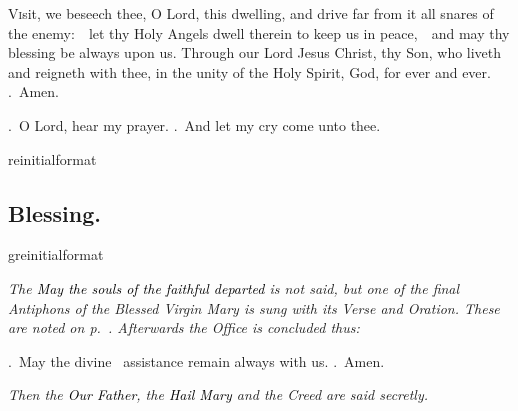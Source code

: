 \documentclass[12pt]{article} %
\newcommand{\myaboveinitial}[1]{%
    \expandafter\renewcommand\csname greinitialformat\endcsname[1]{%
        \fontsize{43}{43}\selectfont ##1
    }
    \gresetfirstlineaboveinitial{\textcolor{benred8}{\raisebox{6.0mm}{\small \textsc{\textbf{#1}}}}}{}
}
\newenvironment{rubric}{\vspace{1 mm}\color{benred8} \itshape \leftskip 0in \setlength{\parindent}{0.25in}}{\vspace{1 mm}}
\newenvironment{response}{\leftskip 0in \setlength{\parindent}{0in}}{\vspace{1 mm}}
\let\oldgresixstar\gresixstar
\renewcommand{\gresixstar}{\textcolor{benred8}{\oldgresixstar}}
\let\oldgredagger\gredagger
\renewcommand{\gredagger}{\textcolor{benred8}{\oldgredagger}}
\let\oldVbar\Vbar
\renewcommand{\Vbar}{\textcolor{benred8}{\oldVbar .}}
\let\oldRbar\Rbar
\renewcommand{\Rbar}{\textcolor{benred8}{\oldRbar .}}
\let\oldgrealtcross\grealtcross
\renewcommand{\grealtcross}{\textcolor{benred8}{\oldgrealtcross}}
\begin{document}
\begin{pages}
\begin{Rightside}
\begin{response}\lettrine{V}{i}sit, we beseech thee, O Lord, this dwelling, and drive far from it all snares of the enemy:~\gredagger\ let thy Holy Angels dwell therein to keep us in peace,~\gresixstar\ and may thy blessing be always upon us. Through our Lord Jesus Christ, thy Son, who liveth and reigneth with thee, in the unity of the Holy Spirit, God, for ever and ever. \Rbar\ Amen.

\end{response}

\pend\pstart

\begin{response}
\Vbar\ O Lord, hear my prayer. \Rbar\ And let my cry come unto thee.

\end{response}

\pend\pstart


\myaboveinitial{II}

\pend\pstart

\subsection*{Blessing.}

\pend\pstart


\myaboveinitial{}

\pend\pstart

\begin{rubric}
The \textcolor{black}{\emph{May the souls of the faithful departed}} is not said, but one of the final Antiphons of the Blessed Virgin Mary is sung with its Verse and Oration. These are noted on p.~\pageref{sec:AntBMV}. Afterwards the Office is concluded thus:

\end{rubric}

\pend\pstart

\begin{response}
\Vbar\ May the divine \grealtcross\ assistance remain always with us. \Rbar\ Amen.

\end{response}

\pend\pstart

\begin{rubric}
Then the \textcolor{black}{\emph{Our Father}}, the \textcolor{black}{\emph{Hail Mary}} and the Creed are said secretly.

\end{rubric}

\pend\endnumbering
\end{Rightside}
\end{pages}
\Pages
\end{document}
